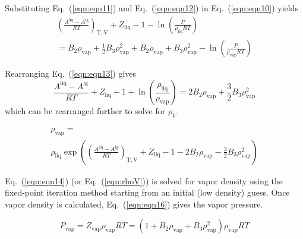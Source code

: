 \documentclass[%
 aip,
 jcp,
 sd,%
 amsmath,amssymb,
 reprint,%
]{revtex4-1}
\begin{document}
Substituting Eq.~(\ref{eqn:eqn11}) and Eq.~(\ref{eqn:eqn12}) in Eq.~(\ref{eqn:eqn10}) yields
\begin{equation}
\begin{array}{l}{\left( {\frac{{{A^{\mathrm{liq}}} - {A^{\mathrm{ig}}}}}{{RT}}} \right)_{\mathrm{T,V}}} + {Z_{\mathrm{liq}}} - 1 - \ln \left( \frac{P}{{{\rho _{\mathrm{liq}}}RT}} \right) \\ = {B_2}{\rho _{\mathrm{vap}}} +
\frac{1}{2}{B_3}\rho _{\mathrm{vap}}^2 + {B_2}{\rho _{\mathrm{vap}}} + {B_3}\rho _{\mathrm{vap}}^2 - \ln \left( \frac{P}{{{\rho _{\mathrm{vap}}}RT}} \right) \end{array}
 \label{eqn:eqn13}
\end{equation}

Rearranging Eq.~(\ref{eqn:eqn13}) gives
\begin{equation}
\frac{{{A^{\mathrm{liq}}} - {A^{\mathrm{ig}}}}}{{RT}} + {Z_{\mathrm{liq}}} - 1 + \ln \left( \frac{{{\rho _{\mathrm{liq}}}}}{{{\rho _{\mathrm{vap}}}}} \right) = 2{B_2} {\rho _{\mathrm{vap}}} + \frac{3}{2}{B_3} \rho _{\mathrm{vap}}^2 \label{eqn:eqn14}
\end{equation}
which can be rearranged further to solve for ${\rho _V}$

\begin{equation}
\begin{array}{l}
{\rho _{\mathrm{vap}} = }
\\ 
{{\rho _{\mathrm{liq}}}\exp \left( {{{\left( {\frac{{{A^{\mathrm{liq}}} - {A^{\mathrm{ig}}}}}{{RT}}} \right)}_{\mathrm{T,V}}} + {Z_{\mathrm{liq}}} - 1 - 2{B_2} {\rho _{\mathrm{vap}}} - \frac{3}{2}{B_3} \rho _{\mathrm{vap}}^2}
\right) }  
\end{array}
\label{eqn:rhoV}
\end{equation}

Eq.~(\ref{eqn:eqn14}) (or Eq.~(\ref{eqn:rhoV})) is solved for vapor density using the fixed-point iteration method \cite{Burden1985} starting from an initial (low density) guess. Once vapor density is calculated, Eq.~(\ref{eqn:eqn16}) gives the vapor pressure.

\begin{equation}
{P_{\mathrm{vap}}} = {Z_{\mathrm{vap}}}{\rho _{\mathrm{vap}}}RT = (1 + {B_2} {\rho _{\mathrm{vap}}} + {B_3}\rho _{\mathrm{vap}}^2){\rho _{\mathrm{vap}}}RT \label{eqn:eqn16}
\end{equation}
\end{document}
